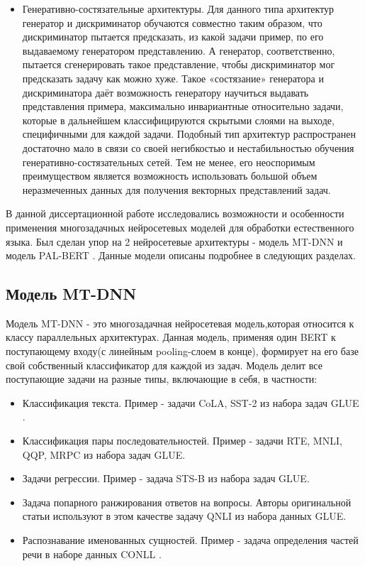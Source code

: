 \begin{itemize}
\item Генеративно-состязательные архитектуры. Для данного типа архитектур генератор и дискриминатор обучаются совместно таким образом, что дискриминатор пытается предсказать, из какой задачи пример, по его выдаваемому генератором представлению. А генератор, соответственно, пытается сгенерировать такое представление, чтобы дискриминатор мог предсказать задачу как можно хуже. Такое «состязание» генератора и дискриминатора даёт возможность генератору научиться выдавать представления примера, максимально инвариантные относительно задачи, которые в дальнейшем классифицируются скрытыми слоями на выходе, специфичными для каждой задачи. Подобный тип архитектур распространен достаточно мало в связи со своей негибкостью и нестабильностью обучения генеративно-состязательных сетей. Тем не менее, его неоспоримым преимуществом является возможность использовать большой объем неразмеченных данных для получения векторных представлений задач. 
\end{itemize}

В данной диссертационной работе исследовались возможности и особенности применения многозадачных нейросетевых моделей для обработки естественного языка. Был сделан упор на 2 нейросетевые архитектуры - модель MT-DNN \cite{mtdnn} и модель PAL-BERT \cite{stickland_2019}. Данные модели описаны подробнее в следующих разделах.

\subsection{Модель MT-DNN}\label{ch:mtl:mtdnn}
Модель MT-DNN - это многозадачная нейросетевая модель,которая относится к классу параллельных архитектурах. Данная модель, применяя один BERT к поступающему входу(с линейным pooling-слоем в конце), формирует на его базе свой собственный классификатор для каждой из задач. Модель делит все поступающие задачи на разные типы, включающие в себя, в частности:
\begin{itemize}
\item Классификация текста. Пример - задачи CoLA, SST-2 из набора задач GLUE \cite{wang_2018}.
\item Классификация пары последовательностей. Пример - задачи RTE, MNLI, QQP, MRPC из набора задач GLUE. 
\item Задачи регрессии. Пример - задача STS-B из набора задач GLUE. 
\item Задача попарного ранжирования ответов на вопросы. Авторы оригинальной статьи используют в этом качестве задачу QNLI из набора данных GLUE.
\item Распознавание именованных сущностей. Пример - задача определения частей речи в наборе данных CONLL \cite{sang_2003}. 
\end{itemize}

